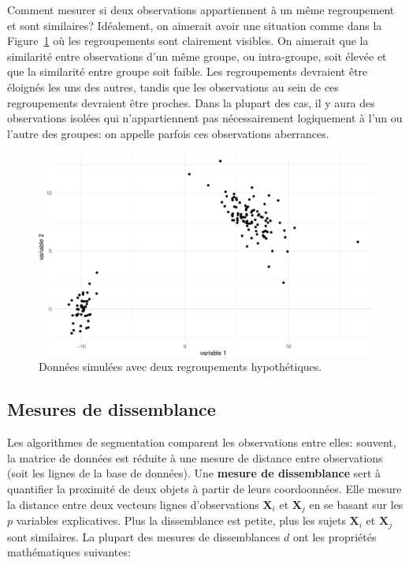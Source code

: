 \documentclass[
  11pt,
  letterpaper,
]{scrbook}
\theoremstyle{definition}
\theoremstyle{remark}
\begin{document}
Comment mesurer si deux observations appartiennent à un même
regroupement et sont similaires? Idéalement, on aimerait avoir une
situation comme dans la Figure~\ref{fig-regroupements-bidons} où les
regroupements sont clairement visibles. On aimerait que la similarité
entre observations d'un même groupe, ou intra-groupe, soit élevée et que
la similarité entre groupe soit faible. Les regroupements devraient être
éloignés les uns des autres, tandis que les observations au sein de ces
regroupements devraient être proches. Dans la plupart des cas, il y aura
des observations isolées qui n'appartiennent pas nécessairement
logiquement à l'un ou l'autre des groupes: on appelle parfois ces
observations aberrances.

\begin{figure}[ht!]

{\centering \includegraphics[width=1\textwidth,height=\textheight]{./03-regroupements_files/figure-pdf/fig-regroupements-bidons-1.pdf}

}

\caption{\label{fig-regroupements-bidons}Données simulées avec deux
regroupements hypothétiques.}

\end{figure}

\hypertarget{mesures-de-dissemblance-1}{%
\subsection{Mesures de dissemblance}\label{mesures-de-dissemblance-1}}

Les algorithmes de segmentation comparent les observations entre elles:
souvent, la matrice de données est réduite à une mesure de distance
entre observations (soit les lignes de la base de données). Une
\textbf{mesure de dissemblance} sert à quantifier la proximité de deux
objets à partir de leurs coordoonnées. Elle mesure la distance entre
deux vecteurs lignes d'observations \(\mathbf{X}_i\) et \(\mathbf{X}_j\)
en se basant sur les \(p\) variables explicatives. Plus la dissemblance
est petite, plus les sujets \(\mathbf{X}_i\) et \(\mathbf{X}_j\) sont
similaires. La plupart des mesures de dissemblances \(d\) ont les
propriétés mathématiques suivantes:
\end{document}
